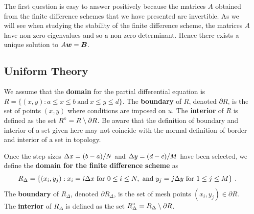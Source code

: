 The first question is easy to answer positively because the matrices
$A$ obtained from the finite difference schemes that we have presented
are invertible.  As we will see when studying the stability of the
finite difference scheme, the matrices $A$ have non-zero eigenvalues
and so a non-zero determinant.  Hence there exists a unique solution
to $A\bm{w}=\bm{B}$.

\subsection{Uniform Theory}

We assume that the {\bfseries domain} for the partial differential
equation is
$R = \{ (x,y) : a \leq x \leq b \ \text{and} \ x \leq y \leq d \}$.
The {\bfseries boundary} of $R$, denoted $\partial R$, is the set of points
$(x,y)$ where conditions are imposed on $u$.  The {\bfseries interior}
of $R$ is defined as the set $\displaystyle R^\circ = R \setminus \partial R$. 
Be aware that the definition of boundary and interior of a set given
here may not coincide with the normal definition of border and
interior of a set in topology.

Once the step sizes $\Delta{x} = (b-a)/N$ and $\Delta{y}=(d-c)/M$ have
been selected, we define the
{\bfseries domain for the finite difference scheme} as
\begin{equation} \label{fdm_DomianDef}
R_\Delta = \{ (x_i,y_j) : x_i = i \dtx{x} \ \text{for} \ 0 \leq i \leq N,
\ \text{and} \ y_j = j \dtx{y} \ \text{for} \ 1 \leq j \leq M \} \ .
\end{equation}
The {\bfseries boundary} of $R_\Delta$, denoted $\partial R_\Delta$, is the set of
mesh points $(x_i,y_j) \in \partial R$.  The
{\bfseries interior} of $R_\Delta$ is defined as the set
$\displaystyle R^\circ_\Delta = R_\Delta \setminus \partial R$.

